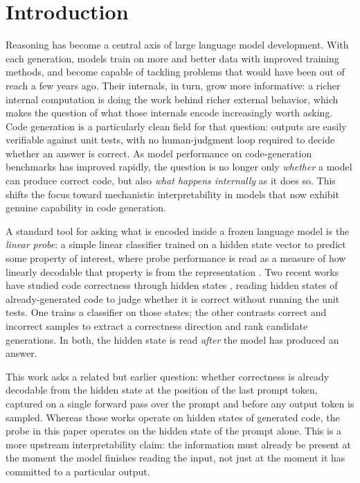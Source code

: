 \section{Introduction}
\label{sec:introduction}

Reasoning has become a central axis of large language model development. With each generation, models train on more and better data with improved training methods, and become capable of tackling problems that would have been out of reach a few years ago. Their internals, in turn, grow more informative: a richer internal computation is doing the work behind richer external behavior, which makes the question of what those internals encode increasingly worth asking. Code generation is a particularly clean field for that question: outputs are easily verifiable against unit tests, with no human-judgment loop required to decide whether an answer is correct. As model performance on code-generation benchmarks has improved rapidly, the question is no longer only \emph{whether} a model can produce correct code, but also \emph{what happens internally} as it does so. This shifts the focus toward mechanistic interpretability in models that now exhibit genuine capability in code generation.

A standard tool for asking what is encoded inside a frozen language model is the \emph{linear probe}: a simple linear classifier trained on a hidden state vector to predict some property of interest, where probe performance is read as a measure of how linearly decodable that property is from the representation \citep{alain2016probes}. Two recent works have studied code correctness through hidden states \citep{bui2025openia, ribeiro2025internal}, reading hidden states of already-generated code to judge whether it is correct without running the unit tests. One trains a classifier on those states; the other contrasts correct and incorrect samples to extract a correctness direction and rank candidate generations. In both, the hidden state is read \emph{after} the model has produced an answer.

This work asks a related but earlier question: whether correctness is already decodable from the hidden state at the position of the last prompt token, captured on a single forward pass over the prompt and before any output token is sampled. Whereas those works operate on hidden states of generated code, the probe in this paper operates on the hidden state of the prompt alone. This is a more upstream interpretability claim: the information must already be present at the moment the model finishes reading the input, not just at the moment it has committed to a particular output.

